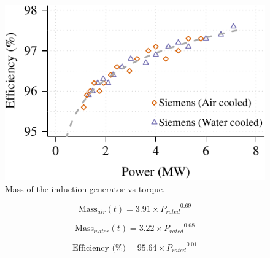 \documentclass{article}\usepackage{graphicx, color}
\makeatletter
\def\maxwidth{ %
  \ifdim\Gin@nat@width>\linewidth
    \linewidth
  \else
    \Gin@nat@width
  \fi
}
\newenvironment{knitrout}{}{} %
\makeatother
\begin{document}
\begin{knitrout}
\color{fgcolor}\begin{figure}[]

\includegraphics[width=\maxwidth]{figure/induction_generator_eeficiency} \caption[Mass of the induction generator vs torque]{Mass of the induction generator vs torque.\label{fig:induction_generator_eeficiency}}
\end{figure}


\end{knitrout}


\begin{equation}
  \text{Mass}_{air}(t) = 3.91 \times {P_{rated}}^{0.69}
\end{equation}

\begin{equation}
  \text{Mass}_{water}(t) = 3.22 \times {P_{rated}}^{0.68}
\end{equation}

\begin{equation}
\text{Efficiency (\%)} = 95.64 \times {P_{rated}}^{0.01}
\end{equation}
\end{document}
